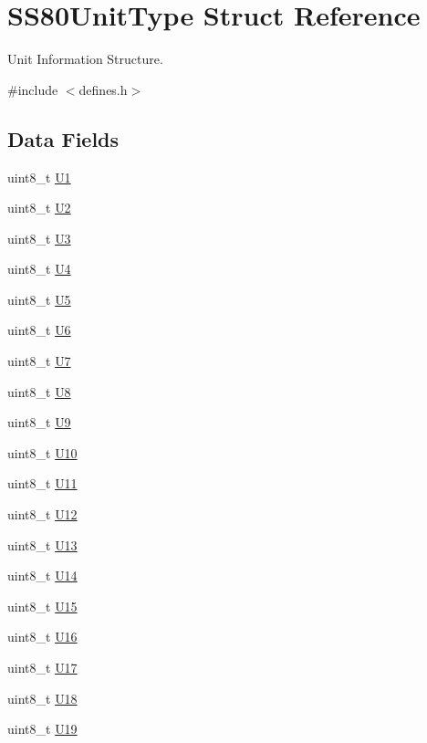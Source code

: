 \hypertarget{structSS80UnitType}{}\section{S\+S80\+Unit\+Type Struct Reference}
\label{structSS80UnitType}


Unit Information Structure.  




{\ttfamily \#include $<$defines.\+h$>$}

\subsection*{Data Fields}
\begin{DoxyCompactItemize}
\item 
uint8\+\_\+t \hyperlink{structSS80UnitType_ad7824d13f00e1e6893f57de54b3a2ac9}{U1}
\item 
uint8\+\_\+t \hyperlink{structSS80UnitType_a0f8959345241baa6f0fb5b17bf15d9e6}{U2}
\item 
uint8\+\_\+t \hyperlink{structSS80UnitType_a0dd8387c09ade023e9fc2bcde07fb4b1}{U3}
\item 
uint8\+\_\+t \hyperlink{structSS80UnitType_ae7248c3b6cdf02493c0be621f8f9a93f}{U4}
\item 
uint8\+\_\+t \hyperlink{structSS80UnitType_a8c9860252085e8de68f08d5148428832}{U5}
\item 
uint8\+\_\+t \hyperlink{structSS80UnitType_a04fb8175375dd46cd891596756196584}{U6}
\item 
uint8\+\_\+t \hyperlink{structSS80UnitType_a7b2386c546a650681e1b91215b06a42a}{U7}
\item 
uint8\+\_\+t \hyperlink{structSS80UnitType_a9179b2db6d9a77eb6fa614e8144ed4e2}{U8}
\item 
uint8\+\_\+t \hyperlink{structSS80UnitType_a8db227e978903c9ae3923225b86c0609}{U9}
\item 
uint8\+\_\+t \hyperlink{structSS80UnitType_a5fbd046709506b3f41c2df598a6373d6}{U10}
\item 
uint8\+\_\+t \hyperlink{structSS80UnitType_aa7840672069613dfaea6b81b9c6d6d71}{U11}
\item 
uint8\+\_\+t \hyperlink{structSS80UnitType_a03dbef211d4dfa850c9795ca4e60a104}{U12}
\item 
uint8\+\_\+t \hyperlink{structSS80UnitType_ac890c3734ea6988e504d71491d48f804}{U13}
\item 
uint8\+\_\+t \hyperlink{structSS80UnitType_a885f26cbcfaf7b80ce64f069401fad7d}{U14}
\item 
uint8\+\_\+t \hyperlink{structSS80UnitType_a088eee3da613c988c4f81c2ec57818de}{U15}
\item 
uint8\+\_\+t \hyperlink{structSS80UnitType_a5087f957d0901655950d803a5a644000}{U16}
\item 
uint8\+\_\+t \hyperlink{structSS80UnitType_aaf021fbac23492c976d5982acafbc221}{U17}
\item 
uint8\+\_\+t \hyperlink{structSS80UnitType_ac3edc72ab1fe21eacc43fc09152d5910}{U18}
\item 
uint8\+\_\+t \hyperlink{structSS80UnitType_a60163b28ab07a19d2cdd464d5298b425}{U19}
\end{DoxyCompactItemize}


